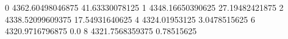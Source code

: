 0 4362.60498046875 41.63330078125
1 4348.16650390625 27.19482421875
2 4338.52099609375 17.54931640625
4 4324.01953125 3.0478515625
6 4320.9716796875 0.0
8 4321.7568359375 0.78515625
